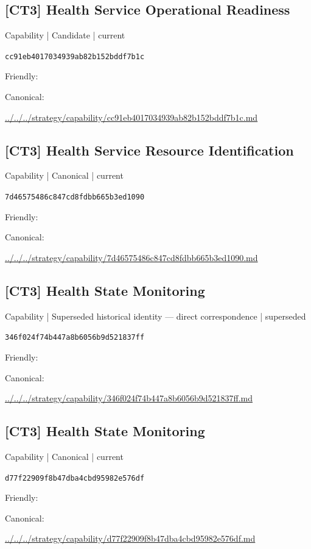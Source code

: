 \documentclass[10pt,a4paper]{article}
\begin{document}
\subsection*{[CT3] Health Service Operational Readiness}
{\small Capability | Candidate | current}\par
\texttt{cc91eb4017034939ab82b152bddf7b1c}\par
Friendly: \par
Canonical: \par
{\footnotesize\url{../../../strategy/capability/cc91eb4017034939ab82b152bddf7b1c.md}}\par
\subsection*{[CT3] Health Service Resource Identification}
{\small Capability | Canonical | current}\par
\texttt{7d46575486c847cd8fdbb665b3ed1090}\par
Friendly: \par
Canonical: \par
{\footnotesize\url{../../../strategy/capability/7d46575486c847cd8fdbb665b3ed1090.md}}\par
\subsection*{[CT3] Health State Monitoring}
{\small Capability | Superseded historical identity — direct correspondence | superseded}\par
\texttt{346f024f74b447a8b6056b9d521837ff}\par
Friendly: \par
Canonical: \par
{\footnotesize\url{../../../strategy/capability/346f024f74b447a8b6056b9d521837ff.md}}\par
\subsection*{[CT3] Health State Monitoring}
{\small Capability | Canonical | current}\par
\texttt{d77f22909f8b47dba4cbd95982e576df}\par
Friendly: \par
Canonical: \par
{\footnotesize\url{../../../strategy/capability/d77f22909f8b47dba4cbd95982e576df.md}}\par
\end{document}
